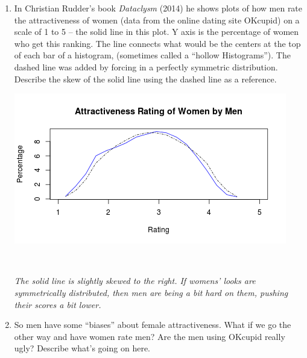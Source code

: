 \begin{enumerate}
\begin{enumerate}
\begin{key}
  {\it  Q1: \$90k, Median: \$110k, Q3: \$135K, IQR: \$25k}
\end{key}
    \item For these data, which is a better summary: mean and standard
      deviation?  or median and IQR? Why?
\begin{students}
    \vspace{1cm}    
\end{students}

\begin{key}
  {\it median and IQR -- due to skewness.}
\end{key}
    \end{enumerate}


  \item In Christian Rudder's book {\it Dataclysm} (2014) he shows
    plots of how men rate the attractiveness of women (data from the
    online dating site OKcupid) on a scale of 1 to 5 -- the solid line
    in this plot.  Y axis is the percentage of women who get this
    ranking. The line connects what would be the centers at the top of
    each bar of a histogram, (sometimes called a ``hollow
    Histograms'').  The dashed line was added by forcing in a
    perfectly symmetric distribution. Describe the skew of the solid
    line using the dashed line as a reference.


\includegraphics[width=.4\linewidth]{../plots/menRateWomen.png}

\begin{students}
   \   \vspace{2cm}    
\end{students}

\begin{key}
  {\it The solid line is slightly skewed to the right. If womens'
    looks are symmetrically distributed, then men are being a bit hard
  on them, pushing their scores a bit lower.}
\end{key}


\item So men have some ``biases'' about female attractiveness.  What
  if we go the other way and have women rate men?  Are the men using
  OKcupid really ugly?  Describe what's going on here.


\end{enumerate}
